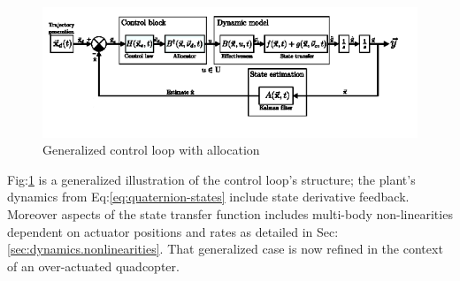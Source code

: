 \begin{figure}[htbp]
\centering
\includegraphics[width=\textwidth]{figs/control-loop}
\caption{Generalized control loop with allocation}
\vspace{-12pt}
\label{fig:control-loop}
\end{figure}
\par
Fig:\ref{fig:control-loop} is a generalized illustration of the control loop's structure; the plant's dynamics from Eq:\ref{eq:quaternion-states} include state derivative feedback. Moreover aspects of the state transfer function includes multi-body non-linearities dependent on actuator positions and rates as detailed in Sec:\ref{sec:dynamics.nonlinearities}. That generalized case is now refined in the context of an over-actuated quadcopter.
